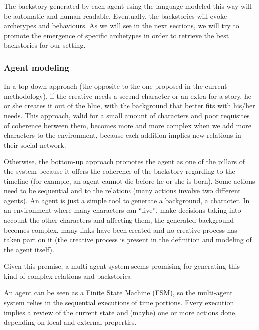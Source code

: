 \documentclass{sig-alternate}
\begin{document}
The backstory generated by each agent using the language modeled this way will be automatic and human readable. Eventually, the backstories will evoke archetypes and behaviours. As we will see in the next sections, we will try to promote the emergence of specific archetypes in order to retrieve the best backstories for our setting.



\subsubsection{Agent modeling}


In a top-down approach (the opposite to the one proposed in the current methodology), if the creative needs a second character or an extra for a story, he or she creates it out of the blue, with the background that better fits with his/her needs. This approach, valid for a small amount of characters and poor requisites of coherence between them, becomes more and more complex when we add more characters to the environment, because each addition implies new relations in their social network.


Otherwise, the bottom-up approach promotes the agent as one of the pillars of the system because it offers the coherence of the backstory regarding to the timeline (for example, an agent cannot die before he or she is born). Some actions need to be sequential and to the relations (many actions involve two different agents). An agent is just a simple tool to generate a background, a character. In an environment where many characters can ``live'', make decisions taking into account the other characters and affecting them, the generated background becomes complex, many links have been created and no creative process has taken part on it (the creative process is present in the definition and modeling of the agent itself).

Given this premise, a multi-agent system seems promising for generating this kind of complex relations and backstories.



An agent can be seen as a Finite State Machine (FSM), so the multi-agent system relies in the sequential executions of time portions. Every execution implies a review of the current state and (maybe) one or more actions done, depending on local and external properties.\\
\end{document}
